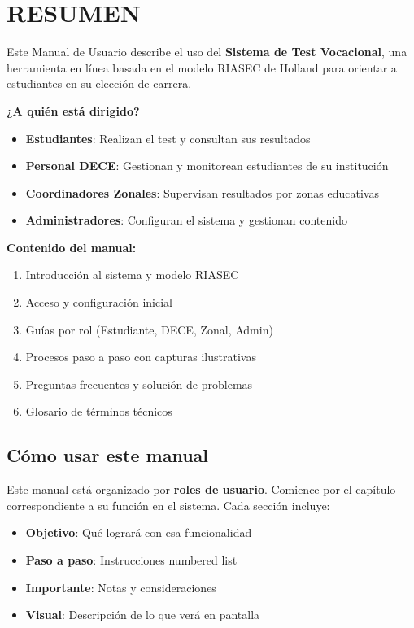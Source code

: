 \documentclass[12pt, a4paper]{report}
\begin{document}
\chapter*{RESUMEN}

Este Manual de Usuario describe el uso del \textbf{Sistema de Test Vocacional}, una herramienta en línea basada en el modelo RIASEC de Holland para orientar a estudiantes en su elección de carrera.

\textbf{¿A quién está dirigido?}
\begin{itemize}
    \item \textbf{Estudiantes}: Realizan el test y consultan sus resultados
    \item \textbf{Personal DECE}: Gestionan y monitorean estudiantes de su institución
    \item \textbf{Coordinadores Zonales}: Supervisan resultados por zonas educativas
    \item \textbf{Administradores}: Configuran el sistema y gestionan contenido
\end{itemize}

\textbf{Contenido del manual:}
\begin{enumerate}
    \item Introducción al sistema y modelo RIASEC
    \item Acceso y configuración inicial
    \item Guías por rol (Estudiante, DECE, Zonal, Admin)
    \item Procesos paso a paso con capturas ilustrativas
    \item Preguntas frecuentes y solución de problemas
    \item Glosario de términos técnicos
\end{enumerate}

\section*{Cómo usar este manual}
Este manual está organizado por \textbf{roles de usuario}. Comience por el capítulo correspondiente a su función en el sistema. Cada sección incluye:
\begin{itemize}
    \item \textbf{Objetivo}: Qué logrará con esa funcionalidad
    \item \textbf{Paso a paso}: Instrucciones numbered list
    \item \textbf{Importante}: Notas y consideraciones
    \item \textbf{Visual}: Descripción de lo que verá en pantalla
\end{itemize}
\end{document}
